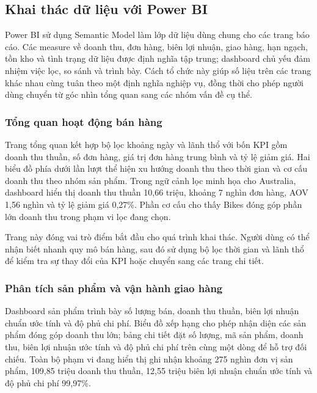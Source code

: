 

\subsection{Khai thác dữ liệu với Power BI}

Power BI sử dụng Semantic Model làm lớp dữ liệu dùng chung cho các trang báo cáo. Các measure về doanh thu, đơn hàng, biên lợi nhuận, giao hàng, hạn ngạch, tồn kho và tình trạng dữ liệu được định nghĩa tập trung; dashboard chủ yếu đảm nhiệm việc lọc, so sánh và trình bày. Cách tổ chức này giúp số liệu trên các trang khác nhau cùng tuân theo một định nghĩa nghiệp vụ, đồng thời cho phép người dùng chuyển từ góc nhìn tổng quan sang các nhóm vấn đề cụ thể.

\subsubsection{Tổng quan hoạt động bán hàng}

Trang tổng quan kết hợp bộ lọc khoảng ngày và lãnh thổ với bốn KPI gồm doanh thu thuần, số đơn hàng, giá trị đơn hàng trung bình và tỷ lệ giảm giá. Hai biểu đồ phía dưới lần lượt thể hiện xu hướng doanh thu theo thời gian và cơ cấu doanh thu theo nhóm sản phẩm. Trong ngữ cảnh lọc minh họa cho Australia, dashboard hiển thị doanh thu thuần 10,66 triệu, khoảng 7 nghìn đơn hàng, AOV 1,56 nghìn và tỷ lệ giảm giá 0,27\%. Phần cơ cấu cho thấy Bikes đóng góp phần lớn doanh thu trong phạm vi lọc đang chọn.


Trang này đóng vai trò điểm bắt đầu cho quá trình khai thác. Người dùng có thể nhận biết nhanh quy mô bán hàng, sau đó sử dụng bộ lọc thời gian và lãnh thổ để kiểm tra sự thay đổi của KPI hoặc chuyển sang các trang chi tiết.

\subsubsection{Phân tích sản phẩm và vận hành giao hàng}

Dashboard sản phẩm trình bày số lượng bán, doanh thu thuần, biên lợi nhuận chuẩn ước tính và độ phủ chi phí. Biểu đồ xếp hạng cho phép nhận diện các sản phẩm đóng góp doanh thu lớn; bảng chi tiết đặt số lượng, mã sản phẩm, doanh thu, biên lợi nhuận ước tính và độ phủ chi phí trên cùng một dòng để hỗ trợ đối chiếu. Toàn bộ phạm vi đang hiển thị ghi nhận khoảng 275 nghìn đơn vị sản phẩm, 109,85 triệu doanh thu thuần, 12,55 triệu biên lợi nhuận chuẩn ước tính và độ phủ chi phí 99,97\%.

